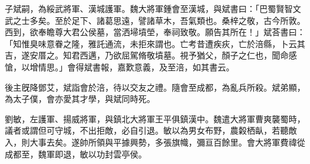 \begin{pinyinscope}
 
 
 
 子斌嗣，為綏武將軍、漢城護軍。魏大將軍鍾會至漢城，與斌書曰：「巴蜀賢智文武之士多矣。至於足下、諸葛思遠，譬諸草木，吾氣類也。桑梓之敬，古今所敦。西到，欲奉瞻尊大君公侯墓，當洒埽墳塋，奉祠致敬。願告其所在！」斌荅書曰：「知惟臭味意眷之隆，雅託通流，未拒來謂也。亡考昔遭疾疢，亡於涪縣，卜云其吉，遂安厝之。知君西邁，乃欲屈駕脩敬墳墓。視予猶父，顏子之仁也，聞命感愴，以增情思。」會得斌書報，嘉歎意義，及至涪，如其書云。
 
 
 
 
 後主旣降鄧艾，斌詣會於涪，待以交友之禮。隨會至成都，為亂兵所殺。斌弟顯，為太子僕，會亦愛其才學，與斌同時死。
 
 
 
 
 劉敏，左護軍、揚威將軍，與鎮北大將軍王平俱鎮漢中。魏遣大將軍曹爽襲蜀時，議者或謂但可守城，不出拒敵，必自引退。敏以為男女布野，農糓栖畒，若聽敵入，則大事去矣。遂帥所領與平據興勢，多張旗幟，彌亘百餘里。會大將軍費禕從成都至，魏軍即退，敏以功封雲亭侯。
 
 
\end{pinyinscope}